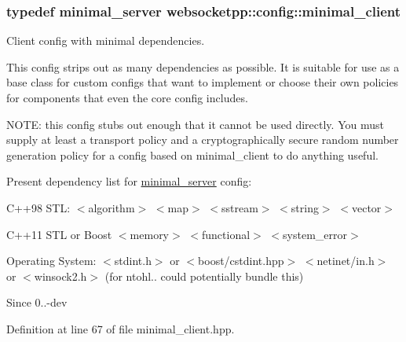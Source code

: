 \subsubsection[{minimal\+\_\+client}]{\setlength{\rightskip}{0pt plus 5cm}typedef {\bf minimal\+\_\+server} {\bf websocketpp\+::config\+::minimal\+\_\+client}}\label{namespacewebsocketpp_1_1config_aa83519c150b67a2f3e05c32b88da0322}


Client config with minimal dependencies. 

This config strips out as many dependencies as possible. It is suitable for use as a base class for custom configs that want to implement or choose their own policies for components that even the core config includes.

N\+O\+T\+E\+: this config stubs out enough that it cannot be used directly. You must supply at least a transport policy and a cryptographically secure random number generation policy for a config based on {\ttfamily minimal\+\_\+client} to do anything useful.

Present dependency list for \hyperlink{structwebsocketpp_1_1config_1_1minimal__server}{minimal\+\_\+server} config\+:

C++98 S\+T\+L\+: $<$algorithm$>$ $<$map$>$ $<$sstream$>$ $<$string$>$ $<$vector$>$

C++11 S\+T\+L or Boost $<$memory$>$ $<$functional$>$ $<$system\+\_\+error$>$

Operating System\+: $<$stdint.\+h$>$ or $<$boost/cstdint.\+hpp$>$ $<$netinet/in.\+h$>$ or $<$winsock2.\+h$>$ (for ntohl.. could potentially bundle this)

\begin{DoxySince}{Since}
0..-\/dev 
\end{DoxySince}


Definition at line 67 of file minimal\+\_\+client.\+hpp.

